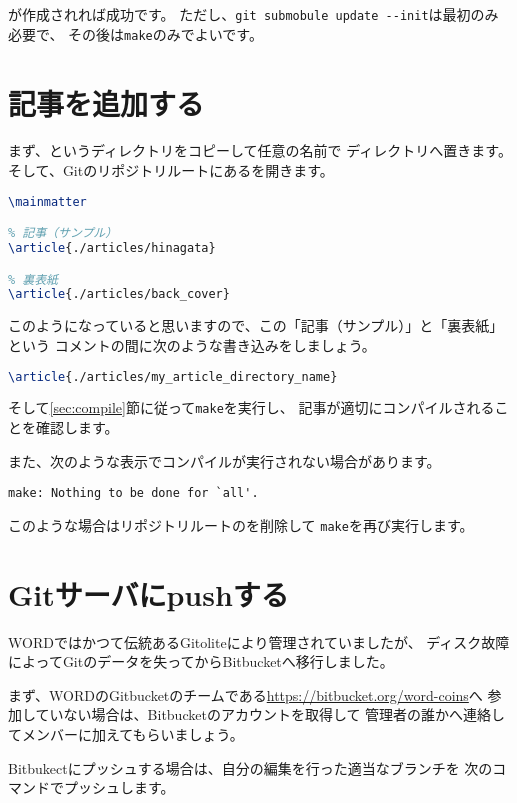 \documentclass[../../main]{subfiles}
\begin{document}
が作成されれば成功です。
ただし、\lstinline|git submobule update --init|は最初のみ必要で、
その後は\lstinline|make|のみでよいです。

\section{記事を追加する}

まず、というディレクトリをコピーして任意の名前で
ディレクトリへ置きます。
そして、Gitのリポジトリルートにあるを開きます。

\begin{lstlisting}[language=TeX]
\mainmatter

% 記事（サンプル）
\article{./articles/hinagata}

% 裏表紙
\article{./articles/back_cover}
\end{lstlisting}

このようになっていると思いますので、この「記事（サンプル）」と「裏表紙」という
コメントの間に次のような書き込みをしましょう。

\begin{lstlisting}[language=TeX]
\article{./articles/my_article_directory_name}
\end{lstlisting}

そして\ref{sec:compile}節に従って\lstinline|make|を実行し、
記事が適切にコンパイルされることを確認します。

また、次のような表示でコンパイルが実行されない場合があります。

\begin{lstlisting}
make: Nothing to be done for `all'.
\end{lstlisting}

このような場合はリポジトリルートのを削除して
\lstinline|make|を再び実行します。

\section{Gitサーバにpushする}

WORDではかつて伝統あるGitoliteにより管理されていましたが、
ディスク故障によってGitのデータを失ってからBitbucketへ移行しました。

まず、WORDのGitbucketのチームである\url{https://bitbucket.org/word-coins}へ
参加していない場合は、Bitbucketのアカウントを取得して
管理者の誰かへ連絡してメンバーに加えてもらいましょう。

Bitbukectにプッシュする場合は、自分の編集を行った適当なブランチを
次のコマンドでプッシュします。
\end{document}
